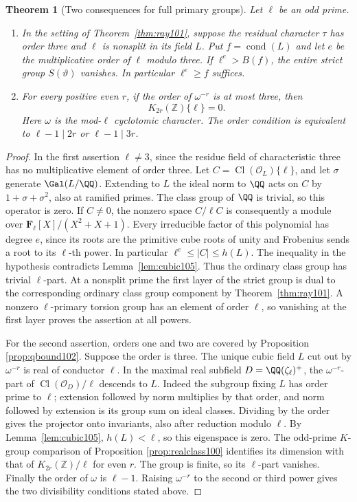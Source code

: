 \documentclass[a4paper,11pt]{article}
\newtheorem{theorem}[proposition]{Theorem}
\theoremstyle{definition}
\theoremstyle{remark}
\newcommand{\ZZ}{\mathbb Z}\newcommand{\ord}{\operatorname{ord}}
\numberwithin{equation}{section}
\newcommand{\Cl}{\operatorname{Cl}}
\newcommand{\OO}{\mathcal O}
\begin{document}
\begin{theorem}[Two consequences for full primary groups]\label{thm:cubic105}
Let \(\ell\) be an odd prime.
\begin{enumerate}
\item In the setting of Theorem~\ref{thm:ray101}, suppose the
residual character \(\tau\) has order three and \(\ell\) is
nonsplit in its field \(L\). Put \(f=\operatorname{cond}(L)\)
and let \(e\) be the multiplicative order of \(\ell\) modulo three.
If \(\ell^e>B(f)\), the entire strict group \(S(\vartheta)\)
vanishes. In particular \(\ell^e\ge f\) suffices.
\item For every positive even \(r\), if the order of
\(\omega^{-r}\) is at most three, then
\[
                       K_{2r}(\ZZ)\{\ell\}=0 .
\]
Here \(\omega\) is the mod-\(\ell\) cyclotomic character.
The order condition is equivalent to
\(\ell-1\mid 2r\) or \(\ell-1\mid3r\).
\end{enumerate}
\end{theorem}
\begin{proof}
In the first assertion \(\ell\ne3\), since the residue field of
characteristic three has no multiplicative element of order three.
Let \(C=\Cl(\OO_L)\{\ell\}\), and let \(\sigma\) generate
\(\Gal(L/\QQ)\). Extending to \(L\) the ideal norm to \(\QQ\)
acts on \(C\) by \(1+\sigma+\sigma^2\), also at ramified primes.
The class group of \(\QQ\) is trivial, so this operator is zero.
If \(C\ne0\), the nonzero space \(C/\ell C\) is consequently a
module over \(\mathbf F_\ell[X]/(X^2+X+1)\). Every irreducible
factor of this polynomial has degree \(e\), since its roots are
the primitive cube roots of unity and Frobenius sends a root to
its \(\ell\)-th power. In particular \(\ell^e\le|C|\le h(L)\).
The inequality in the hypothesis contradicts
Lemma~\ref{lem:cubic105}. Thus the ordinary class group has
trivial \(\ell\)-part. At a nonsplit prime the first layer of
the strict group is dual to the corresponding ordinary class
group component by Theorem~\ref{thm:ray101}. A nonzero
\(\ell\)-primary torsion group has an element of order \(\ell\),
so vanishing at the first layer proves the assertion at all powers.

For the second assertion, orders one and two are covered by
Proposition \ref{prop:qbound102}.
Suppose the order is three. The unique cubic field \(L\) cut out
by \(\omega^{-r}\) is real of conductor \(\ell\). In the maximal
real subfield \(D=\QQ(\zeta_\ell)^+\), the
\(\omega^{-r}\)-part of \(\Cl(\OO_D)/\ell\) descends to \(L\).
Indeed the subgroup fixing \(L\) has order prime to \(\ell\);
extension followed by norm multiplies by that order, and norm
followed by extension is its group sum on ideal classes.
Dividing by the order gives the projector onto invariants, also
after reduction modulo \(\ell\).
By Lemma~\ref{lem:cubic105}, \(h(L)<\ell\), so this eigenspace
is zero. The odd-prime \(K\)-group comparison of
Proposition \ref{prop:realclass100}
identifies its dimension with that of \(K_{2r}(\ZZ)/\ell\)
for even \(r\). The group is finite, so its \(\ell\)-part
vanishes. Finally the order of \(\omega\) is \(\ell-1\).
Raising \(\omega^{-r}\) to the second or third power gives the
two divisibility conditions stated above.
\end{proof}
\end{document}
